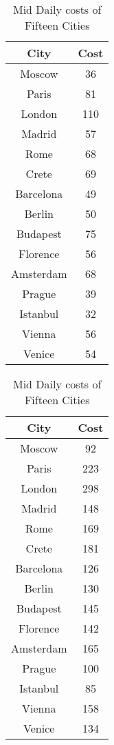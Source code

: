 \documentclass[12pt]{article}
\begin{document}
\begin{table}[ht!]
	\begin{minipage}[b]{0.45\linewidth}
		\caption{Low Daily costs of Fifteen Cities}
		\centering
		\vspace{1mm}
		\begin{tabular}{c|c}
			\hline
			\rule{0pt}{2ex} City & Cost  \\
			\hline
			\rule{0pt}{2ex}Moscow & 36 \\
			Paris & 81 \\
			London & 110 \\
			Madrid & 57 \\
			Rome & 68 \\
			Crete & 69 \\
			Barcelona & 49 \\
			Berlin & 50 \\
			Budapest & 75 \\
			Florence & 56 \\
			Amsterdam & 68 \\
			Prague & 39 \\
			Istanbul & 32 \\
			Vienna & 56 \\
			Venice & 54 \\
		\end{tabular}
	\end{minipage}
	\hspace{0.5cm}
	\begin{minipage}[b]{0.45\linewidth}
		\caption{Mid Daily costs of Fifteen Cities}
		\centering
		\vspace{1mm}
		\begin{tabular}{c|c}
			\hline
			\rule{0pt}{2ex} City & Cost  \\
			\hline
			\rule{0pt}{2ex}Moscow & 92 \\
			Paris & 223 \\
			London & 298 \\
			Madrid & 148 \\
			Rome & 169 \\
			Crete & 181 \\
			Barcelona & 126 \\
			Berlin & 130 \\
			Budapest & 145 \\
			Florence & 142 \\
			Amsterdam & 165 \\
			Prague & 100 \\
			Istanbul & 85 \\
			Vienna & 158 \\
			Venice & 134 \\
		\end{tabular}
	\end{minipage}
\end{table}
\end{document}
